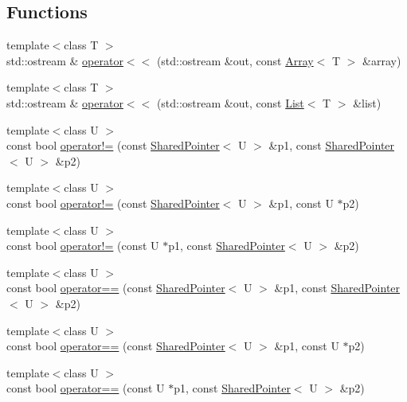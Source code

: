 \subsection*{Functions}
\begin{DoxyCompactItemize}
\item 
{\footnotesize template$<$class T $>$ }\\std\+::ostream \& \hyperlink{namespaceprism_a403ca8f79c481a89132691c0fd8c3a06}{operator$<$$<$} (std\+::ostream \&out, const \hyperlink{classprism_1_1_array}{Array}$<$ T $>$ \&array)
\item 
{\footnotesize template$<$class T $>$ }\\std\+::ostream \& \hyperlink{namespaceprism_a50da64555d454821545fe0311fde6a62}{operator$<$$<$} (std\+::ostream \&out, const \hyperlink{classprism_1_1_list}{List}$<$ T $>$ \&list)
\item 
{\footnotesize template$<$class U $>$ }\\const bool \hyperlink{namespaceprism_a9df924e4deb059bf1200701c8235410a}{operator!=} (const \hyperlink{classprism_1_1_shared_pointer}{Shared\+Pointer}$<$ U $>$ \&p1, const \hyperlink{classprism_1_1_shared_pointer}{Shared\+Pointer}$<$ U $>$ \&p2)
\item 
{\footnotesize template$<$class U $>$ }\\const bool \hyperlink{namespaceprism_ad6391c124e006b0e3a3ec67f55e208b0}{operator!=} (const \hyperlink{classprism_1_1_shared_pointer}{Shared\+Pointer}$<$ U $>$ \&p1, const U $\ast$p2)
\item 
{\footnotesize template$<$class U $>$ }\\const bool \hyperlink{namespaceprism_ab8792dbd5cac5678390843bacdb69daa}{operator!=} (const U $\ast$p1, const \hyperlink{classprism_1_1_shared_pointer}{Shared\+Pointer}$<$ U $>$ \&p2)
\item 
{\footnotesize template$<$class U $>$ }\\const bool \hyperlink{namespaceprism_ae53d52e8a36ec7ca58ea1731cc18f1d8}{operator==} (const \hyperlink{classprism_1_1_shared_pointer}{Shared\+Pointer}$<$ U $>$ \&p1, const \hyperlink{classprism_1_1_shared_pointer}{Shared\+Pointer}$<$ U $>$ \&p2)
\item 
{\footnotesize template$<$class U $>$ }\\const bool \hyperlink{namespaceprism_a2b73e87f080646696ed6b595a3900119}{operator==} (const \hyperlink{classprism_1_1_shared_pointer}{Shared\+Pointer}$<$ U $>$ \&p1, const U $\ast$p2)
\item 
{\footnotesize template$<$class U $>$ }\\const bool \hyperlink{namespaceprism_a1f29b22985dc0ec1fc548a551ce313ed}{operator==} (const U $\ast$p1, const \hyperlink{classprism_1_1_shared_pointer}{Shared\+Pointer}$<$ U $>$ \&p2)

\end{DoxyCompactItemize}
